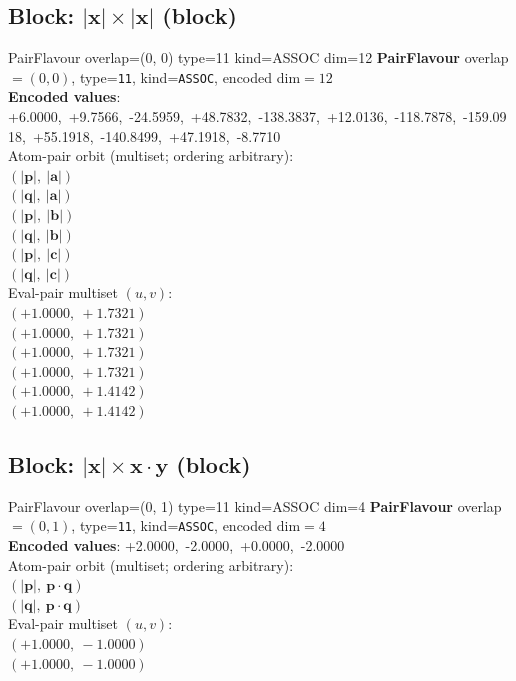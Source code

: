\documentclass[a4paper,11pt]{article}
\newcommand{\vc}[1]{\ensuremath{\mathbf{#1}}}
\newcommand{\dnfagmiihhiejm}[1]{|\vc{#1}|}
\newcommand{\pdcegfomjfhook}[2]{\mathbf{#1} \cdot \mathbf{#2}}
\begin{document}
\subsection{Block: $\dnfagmiihhiejm{x} \times \dnfagmiihhiejm{x}$  (block)}
    PairFlavour  overlap=(0, 0)  type=11  kind=ASSOC  dim=12
\textbf{PairFlavour} overlap$=(0, 0)$, type=\texttt{11}, kind=\texttt{ASSOC}, encoded dim$=12$\\
\textbf{      Encoded values}: +6.0000,\ +9.7566,\ -24.5959,\ +48.7832,\ -138.3837,\ +12.0136,\ -118.7878,\ -159.0918,\ +55.1918,\ -140.8499,\ +47.1918,\ -8.7710\\
\quad Atom-pair orbit (multiset; ordering arbitrary):\\
$(\dnfagmiihhiejm{p},\ \dnfagmiihhiejm{a})$\\
$(\dnfagmiihhiejm{q},\ \dnfagmiihhiejm{a})$\\
$(\dnfagmiihhiejm{p},\ \dnfagmiihhiejm{b})$\\
$(\dnfagmiihhiejm{q},\ \dnfagmiihhiejm{b})$\\
$(\dnfagmiihhiejm{p},\ \dnfagmiihhiejm{c})$\\
$(\dnfagmiihhiejm{q},\ \dnfagmiihhiejm{c})$\\
\quad Eval-pair multiset $(u, v)$:\\
$(+1.0000,\ +1.7321)$\\
$(+1.0000,\ +1.7321)$\\
$(+1.0000,\ +1.7321)$\\
$(+1.0000,\ +1.7321)$\\
$(+1.0000,\ +1.4142)$\\
$(+1.0000,\ +1.4142)$\\

\subsection{Block: $\dnfagmiihhiejm{x} \times \pdcegfomjfhook{x}{y}$  (block)}
    PairFlavour  overlap=(0, 1)  type=11  kind=ASSOC  dim=4
\textbf{PairFlavour} overlap$=(0, 1)$, type=\texttt{11}, kind=\texttt{ASSOC}, encoded dim$=4$\\
\textbf{      Encoded values}: +2.0000,\ -2.0000,\ +0.0000,\ -2.0000\\
\quad Atom-pair orbit (multiset; ordering arbitrary):\\
$(\dnfagmiihhiejm{p},\ \pdcegfomjfhook{p}{q})$\\
$(\dnfagmiihhiejm{q},\ \pdcegfomjfhook{p}{q})$\\
\quad Eval-pair multiset $(u, v)$:\\
$(+1.0000,\ -1.0000)$\\
$(+1.0000,\ -1.0000)$\\
\end{document}
